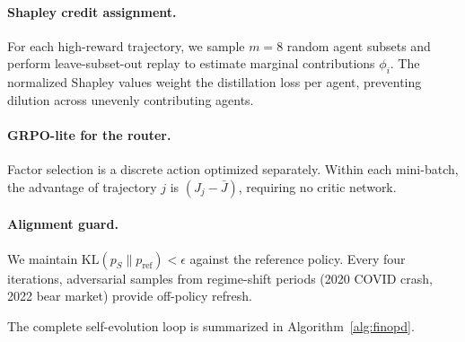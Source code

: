 \paragraph{Shapley credit assignment.} For each high-reward trajectory, we sample $m{=}8$ random agent subsets and perform leave-subset-out replay to estimate marginal contributions $\phi_i$. The normalized Shapley values weight the distillation loss per agent, preventing dilution across unevenly contributing agents.

\paragraph{GRPO-lite for the router.} Factor selection is a discrete action optimized separately. Within each mini-batch, the advantage of trajectory $j$ is $(J_j - \bar{J})$, requiring no critic network.

\paragraph{Alignment guard.} We maintain $\mathrm{KL}(p_S \| p_{\mathrm{ref}}) < \epsilon$ against the reference policy. Every four iterations, adversarial samples from regime-shift periods (2020 COVID crash, 2022 bear market) provide off-policy refresh.

The complete self-evolution loop is summarized in Algorithm~\ref{alg:finopd}.

